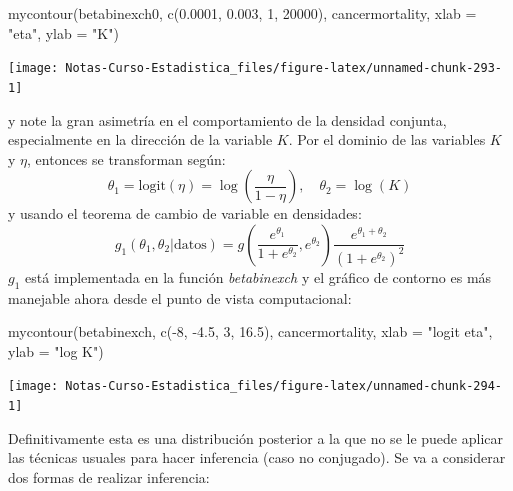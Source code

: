\documentclass[
  12pt,
]{book}
\newenvironment{Shaded}{\begin{snugshade}}{\end{snugshade}}
\newcommand{\AttributeTok}[1]{\textcolor[rgb]{0.77,0.63,0.00}{#1}}
\newcommand{\DecValTok}[1]{\textcolor[rgb]{0.00,0.00,0.81}{#1}}
\newcommand{\FloatTok}[1]{\textcolor[rgb]{0.00,0.00,0.81}{#1}}
\newcommand{\FunctionTok}[1]{\textcolor[rgb]{0.00,0.00,0.00}{#1}}
\newcommand{\NormalTok}[1]{#1}
\newcommand{\SpecialCharTok}[1]{\textcolor[rgb]{0.00,0.00,0.00}{#1}}
\newcommand{\StringTok}[1]{\textcolor[rgb]{0.31,0.60,0.02}{#1}}
\begin{document}
\begin{Shaded}
\begin{Highlighting}[]
\FunctionTok{mycontour}\NormalTok{(betabinexch0, }\FunctionTok{c}\NormalTok{(}\FloatTok{0.0001}\NormalTok{, }\FloatTok{0.003}\NormalTok{, }\DecValTok{1}\NormalTok{, }\DecValTok{20000}\NormalTok{),}
\NormalTok{    cancermortality, }\AttributeTok{xlab =} \StringTok{"eta"}\NormalTok{, }\AttributeTok{ylab =} \StringTok{"K"}\NormalTok{)}
\end{Highlighting}
\end{Shaded}

\begin{center}\texttt{[image: Notas-Curso-Estadistica\_files/figure-latex/unnamed-chunk-293-1]} \end{center}

y note la gran asimetría en el comportamiento de la densidad conjunta,
especialmente en la dirección de la variable \(K\). Por el dominio de
las variables \(K\) y \(\eta\), entonces se transforman según:
\[\theta_1=\text{logit}(\eta)=\log\left(\frac{\eta}{1-\eta}\right),\quad  \theta_2=\log(K)\]
y usando el teorema de cambio de variable en densidades:
\[g_1(\theta_1,\theta_2|\text{datos})=g\left(\frac{e^{\theta_1}}{1+e^{\theta_2}},e^{\theta_2}\right)\frac{e^{\theta_1+\theta_2}}{(1+e^{\theta_2})^2}\]
\(g_1\) está implementada en la función \emph{betabinexch} y el gráfico
de contorno es más manejable ahora desde el punto de vista
computacional:

\begin{Shaded}
\begin{Highlighting}[]
\FunctionTok{mycontour}\NormalTok{(betabinexch, }\FunctionTok{c}\NormalTok{(}\SpecialCharTok{{-}}\DecValTok{8}\NormalTok{, }\SpecialCharTok{{-}}\FloatTok{4.5}\NormalTok{, }\DecValTok{3}\NormalTok{, }\FloatTok{16.5}\NormalTok{), cancermortality,}
    \AttributeTok{xlab =} \StringTok{"logit eta"}\NormalTok{, }\AttributeTok{ylab =} \StringTok{"log K"}\NormalTok{)}
\end{Highlighting}
\end{Shaded}

\begin{center}\texttt{[image: Notas-Curso-Estadistica\_files/figure-latex/unnamed-chunk-294-1]} \end{center}

Definitivamente esta es una distribución posterior a la que no se le
puede aplicar las técnicas usuales para hacer inferencia (caso no
conjugado). Se va a considerar dos formas de realizar inferencia:
\end{document}
